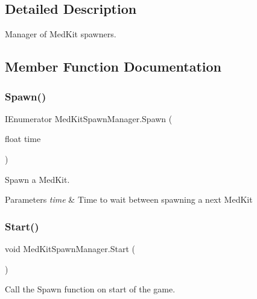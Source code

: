 \subsection{Detailed Description}
Manager of Med\+Kit spawners. 

\subsection{Member Function Documentation}
\mbox{\label{class_med_kit_spawn_manager_acb9074cfc83743c027e223fa29a8ec35}} 
\subsubsection{\texorpdfstring{Spawn()}{Spawn()}}
{\footnotesize\ttfamily I\+Enumerator Med\+Kit\+Spawn\+Manager.\+Spawn (\begin{DoxyParamCaption}\item[{float}]{time }\end{DoxyParamCaption})\hspace{0.3cm}{\ttfamily [private]}}



Spawn a Med\+Kit. 


\begin{DoxyParams}{Parameters}
{\em time} & Time to wait between spawning a next Med\+Kit \\
\hline
\end{DoxyParams}
\mbox{\label{class_med_kit_spawn_manager_ae2b648dc825452905358189902b7df2e}} 
\subsubsection{\texorpdfstring{Start()}{Start()}}
{\footnotesize\ttfamily void Med\+Kit\+Spawn\+Manager.\+Start (\begin{DoxyParamCaption}{ }\end{DoxyParamCaption})\hspace{0.3cm}{\ttfamily [private]}}



Call the Spawn function on start of the game. 



